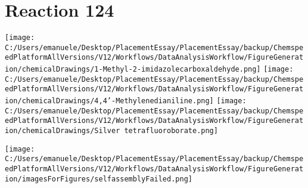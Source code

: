 \documentclass{article}%
\begin{document}
\section*{Reaction 124}%
%
\begin{scheme}[H]%
\begin{minipage}{0.5\textwidth}%
\texttt{[image: C:/Users/emanuele/Desktop/PlacementEssay/PlacementEssay/backup/ChemspeedPlatformAllVersions/V12/Workflows/DataAnalysisWorkflow/FigureGeneration/chemicalDrawings/1-Methyl-2-imidazolecarboxaldehyde.png]}%
\texttt{[image: C:/Users/emanuele/Desktop/PlacementEssay/PlacementEssay/backup/ChemspeedPlatformAllVersions/V12/Workflows/DataAnalysisWorkflow/FigureGeneration/chemicalDrawings/4,4'-Methylenedianiline.png]}%
\texttt{[image: C:/Users/emanuele/Desktop/PlacementEssay/PlacementEssay/backup/ChemspeedPlatformAllVersions/V12/Workflows/DataAnalysisWorkflow/FigureGeneration/chemicalDrawings/Silver tetrafluoroborate.png]}%
\end{minipage}%
\begin{minipage}{0.5\textwidth}%
\begin{center}%
\texttt{[image: C:/Users/emanuele/Desktop/PlacementEssay/PlacementEssay/backup/ChemspeedPlatformAllVersions/V12/Workflows/DataAnalysisWorkflow/FigureGeneration/imagesForFigures/selfassemblyFailed.png]}%
\end{center}%
\end{minipage}%
\caption{Self-assembly of components 12, 17, with Silver(I) in a 3.0:1.5:1.0 molar ratio in CH$_3$CN at 60\textdegree C for 40h. These are the reagents (starting materials) for reaction 124.}%
\end{scheme}%
\end{document}
